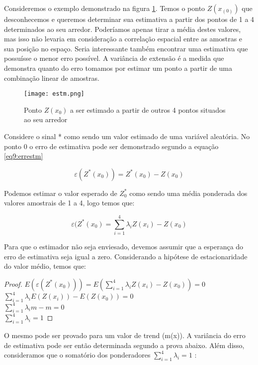 Consideremos o exemplo demonstrado na figura \ref{estm}. Temos o ponto $Z(x_(0))$ que desconhecemos e queremos determinar sua estimativa a partir dos pontos de 1 a 4 determinados ao seu arredor. Poderíamos apenas tirar a média destes valores, mas isso não levaria em consideração a correlação espacial entre as amostras e sua posição no espaço. Seria interessante também encontrar uma estimativa que possuísse o menor erro possível. A variância de extensão é a medida que demonstra quanto do erro tomamos por estimar um ponto a partir de uma combinação linear de amostras. 

\begin{figure}
\centering
\texttt{[image: estm.png]}	
\caption{Ponto $Z(x_{0})$ a ser estimado a partir de outros 4 pontos situados ao seu arredor}
\label{estm}
\end{figure}

Considere o sinal * como sendo um valor estimado de uma variável aleatória. No ponto 0 o erro de estimativa pode ser demonstrado segundo a equação \eqref{eq9:errestm}

\begin{equation}\label{eq9:errestm}
\varepsilon (Z^{*}(x_{0})) = Z^{*}(x_{0}) -Z(x_{0}) 
\end{equation}

Podemos estimar o valor esperado de $Z^{*}_{0}$ como sendo uma média ponderada dos valores amostrais de 1 a 4, logo temos que: 

\begin{equation}\label{eq9:errestm2}
\varepsilon (Z^{*}(x_{0}) = \sum_{i=1}^{4}\lambda _{i}Z(x_{i}) -Z(x_{0})   
\end{equation}

Para que o estimador não seja enviesado, devemos assumir que a esperança do erro de estimativa seja igual a zero. Considerando a hipótese de estacionaridade do valor médio, temos que: 

\begin{proof}
$E(\varepsilon (Z^{*}(x_{0}))) = E(\sum_{i=1}^{4}\lambda _{i}Z(x_{i}) -Z(x_{0})) = 0 $
\\$\sum_{i=1}^{4}\lambda _{i}E(Z(x_{i})) -E(Z(x_{0})) = 0 $
\\$\sum_{i=1}^{4}\lambda _{i}m -m = 0 $ 
\\$\sum_{i=1}^{4}\lambda _{i} = 1 $  	
\end{proof}


O mesmo pode ser provado para um valor de trend (m(x)). A variância do erro de estimativa pode ser então determinada segundo a prova abaixo. Além disso, consideramos que o somatório dos ponderadores $\sum_{i=1}^{4}\lambda _{i}=1$ :

